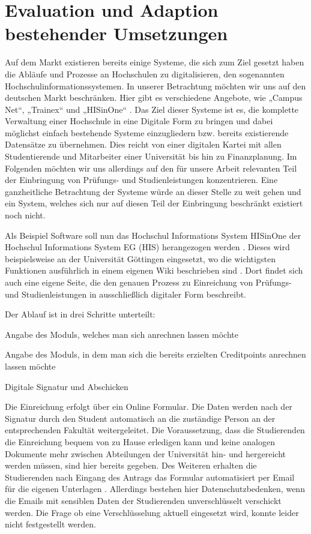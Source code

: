 \section{Evaluation und Adaption bestehender Umsetzungen}

Auf dem Markt existieren bereits einige Systeme, die sich zum Ziel gesetzt haben die Abläufe und Prozesse an Hochschulen zu digitalisieren, den sogenannten Hochschulinformationssystemen. In unserer Betrachtung möchten wir uns auf den deutschen Markt beschränken. Hier gibt es verschiedene Angebote, wie „Campus Net“, „Trainex“ und „HISinOne“ \parencite{wiki_his}. Das Ziel dieser Systeme ist es, die komplette Verwaltung einer Hochschule in eine Digitale Form zu bringen und dabei möglichst einfach bestehende Systeme einzugliedern bzw. bereits existierende Datensätze zu übernehmen. Dies reicht von einer digitalen Kartei mit allen Studentierende und Mitarbeiter einer Universität bis hin zu Finanzplanung. Im Folgenden möchten wir uns allerdings auf den für unsere Arbeit relevanten Teil der Einbringung von Prüfungs- und Studienleistungen konzentrieren. Eine ganzheitliche Betrachtung der Systeme würde an dieser Stelle zu weit gehen und ein System, welches sich nur auf diesen Teil der Einbringung beschränkt existiert noch nicht.

Als Beispiel Software soll nun das Hochschul Informations System HISinOne der Hochschul Informations System EG (HIS) herangezogen werden \parencite{hisde}. Dieses wird beispielsweise an der Universität Göttingen eingesetzt, wo die wichtigsten Funktionen ausführlich in einem eigenen Wiki beschrieben sind \parencite{studit}. Dort findet sich auch eine eigene Seite, die den genauen Prozess zu Einreichung von Prüfungs- und Studienleistungen in ausschließlich digitaler Form beschreibt. 

Der Ablauf ist in drei Schritte unterteilt:

\begin{compactenum}
\item Angabe des Moduls, welches man sich anrechnen lassen möchte
\item Angabe des Moduls, in dem man sich die bereits erzielten Creditpoints anrechnen lassen möchte
\item Digitale Signatur und Abschicken
\end{compactenum}

Die Einreichung erfolgt über ein Online Formular. Die Daten werden nach der Signatur durch den Student automatisch an die zuständige Person an der entsprechenden Fakultät weitergeleitet. Die Voraussetzung, dass die Studierenden die Einreichung bequem von zu Hause erledigen kann und keine analogen Dokumente mehr zwischen Abteilungen der Universität hin- und hergereicht werden müssen, sind hier bereits gegeben. Des Weiteren erhalten die Studierenden nach Eingang des Antrags das Formular automatisiert per Email für die eigenen Unterlagen \parencite{studit_formular}. Allerdings bestehen hier Datenschutzbedenken, wenn die Emails mit sensiblen Daten der Studierenden unverschlüsselt verschickt werden. Die Frage ob eine Verschlüsselung aktuell eingesetzt wird, konnte leider nicht festgestellt  werden.
